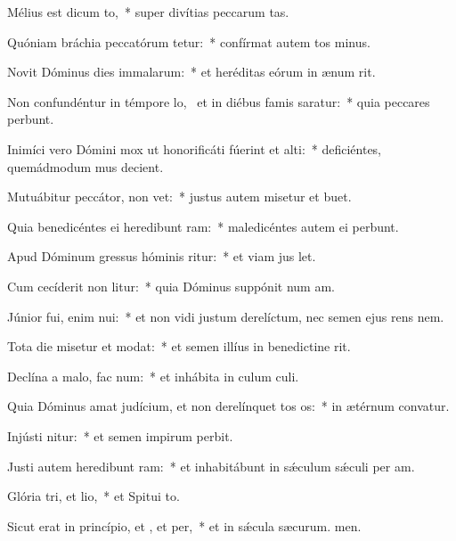 \item Mélius est dicum to,~* super divítias peccarum tas.
\item Quóniam bráchia peccatórum tetur:~* confírmat autem tos minus.
\item Novit Dóminus dies immalarum:~* et heréditas eórum in ænum rit.
\item Non confundéntur in témpore lo,~\pscross{} et in diébus famis saratur:~* quia peccares perbunt.
\item Inimíci vero Dómini mox ut honorificáti fúerint et alti:~* deficiéntes, quemádmodum mus decient.
\item Mutuábitur peccátor,  non vet:~* justus autem misetur et buet.
\item Quia benedicéntes ei heredibunt ram:~* maledicéntes autem ei perbunt.
\item Apud Dóminum gressus hóminis ritur:~* et viam jus let.
\item Cum cecíderit non litur:~* quia Dóminus suppónit num am.
\item Júnior fui, enim nui:~* et non vidi justum derelíctum, nec semen ejus rens nem.
\item Tota die misetur et modat:~* et semen illíus in benedictine rit.
\item Declína a malo,  fac num:~* et inhábita in culum culi.
\item Quia Dóminus amat judícium, et non derelínquet tos os:~* in ætérnum convatur.
\item Injústi nitur:~* et semen impirum perbit.
\item Justi autem heredibunt ram:~* et inhabitábunt in sǽculum sǽculi per am.
\item Glória tri, et lio,~* et Spitui to.
\item Sicut erat in princípio, et , et per,~* et in sǽcula sæcurum. men.
